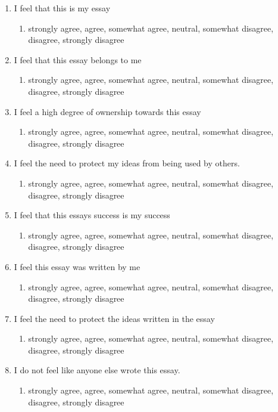 \documentclass[sigconf]{acmart}
\begin{document}
    \begin{enumerate}
        \item I feel that this is my essay
        \begin{enumerate}
            \item strongly agree, agree, somewhat agree, neutral, somewhat disagree, disagree, strongly disagree
        \end{enumerate}
        \item I feel that this essay belongs to me
        \begin{enumerate}
            \item strongly agree, agree, somewhat agree, neutral, somewhat disagree, disagree, strongly disagree
        \end{enumerate}
        \item I feel a high degree of ownership towards this essay
        \begin{enumerate}
            \item strongly agree, agree, somewhat agree, neutral, somewhat disagree, disagree, strongly disagree
        \end{enumerate}
        \item I feel the need to protect my ideas from being used by others.
        \begin{enumerate}
            \item strongly agree, agree, somewhat agree, neutral, somewhat disagree, disagree, strongly disagree
        \end{enumerate}
        \item I feel that this essays success is my success
        \begin{enumerate}
            \item strongly agree, agree, somewhat agree, neutral, somewhat disagree, disagree, strongly disagree
        \end{enumerate}
        \item I feel this essay was written by me
        \begin{enumerate}
            \item strongly agree, agree, somewhat agree, neutral, somewhat disagree, disagree, strongly disagree
        \end{enumerate}
        \item I feel the need to protect the ideas written in the essay
        \begin{enumerate}
            \item strongly agree, agree, somewhat agree, neutral, somewhat disagree, disagree, strongly disagree
        \end{enumerate}
        \item I do not feel like anyone else wrote this essay.
        \begin{enumerate}
            \item strongly agree, agree, somewhat agree, neutral, somewhat disagree, disagree, strongly disagree
        \end{enumerate}
    \end{enumerate}
\end{document}
